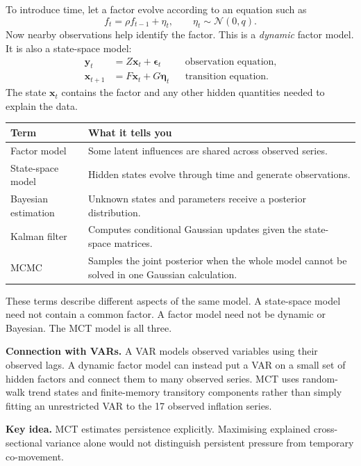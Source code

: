 \documentclass[11pt,a4paper]{article}
\newcommand{\N}{\mathcal N}
\newcommand{\takeaway}[1]{\par\medskip\noindent\colorbox{pale}{\parbox{\dimexpr\linewidth-2\fboxsep}{\textbf{Key idea.} #1}}\par\medskip}
\begin{document}
To introduce time, let a factor evolve according to an equation such as
\[
f_t=\rho f_{t-1}+\eta_t,\qquad \eta_t\sim\N(0,q).
\]
Now nearby observations help identify the factor. This is a \emph{dynamic} factor model. It is also a state-space model:
\begin{align*}
\mathbf y_t&=Z\mathbf x_t+\boldsymbol\epsilon_t
&&\text{observation equation},\\
\mathbf x_{t+1}&=F\mathbf x_t+G\boldsymbol\eta_t
&&\text{transition equation}.
\end{align*}
The state $\mathbf x_t$ contains the factor and any other hidden quantities needed to explain the data.

\begin{center}
\begin{tabular}{p{.22\linewidth}p{.67\linewidth}}
\toprule
Term & What it tells you\\\midrule
Factor model & Some latent influences are shared across observed series.\\
State-space model & Hidden states evolve through time and generate observations.\\
Bayesian estimation & Unknown states and parameters receive a posterior distribution.\\
Kalman filter & Computes conditional Gaussian updates given the state-space matrices.\\
MCMC & Samples the joint posterior when the whole model cannot be solved in one Gaussian calculation.\\\bottomrule
\end{tabular}
\end{center}

These terms describe different aspects of the same model. A state-space model need not contain a common factor. A factor model need not be dynamic or Bayesian. The MCT model is all three.

\textbf{Connection with VARs.} A VAR models observed variables using their observed lags. A dynamic factor model can instead put a VAR on a small set of hidden factors and connect them to many observed series. MCT uses random-walk trend states and finite-memory transitory components rather than simply fitting an unrestricted VAR to the 17 observed inflation series.
\takeaway{MCT estimates persistence explicitly. Maximising explained cross-sectional variance alone would not distinguish persistent pressure from temporary co-movement.}

\newpage
\end{document}

